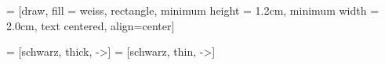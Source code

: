 
 = [draw,
                         fill           = weiss,
                         rectangle,
                         minimum height = 1.2cm,
                         minimum width  = 2.0cm,
                         text centered,
                         align=center]


    = [schwarz, thick, ->]
 = [schwarz, thin, ->]
